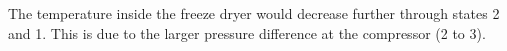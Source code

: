 The temperature inside the freeze dryer would decrease further through states 2 and 1. This is due to the larger pressure difference at the compressor (2 to 3).